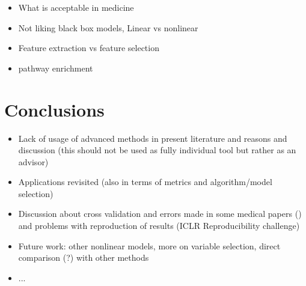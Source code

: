 \documentclass[shortabstract, english, mgr]{iithesis}
\begin{document}
\begin{itemize}
    \item What is acceptable in medicine
    \item Not liking black box models, Linear vs nonlinear
    \item Feature extraction vs feature selection
    \item pathway enrichment
\end{itemize}

\chapter{Conclusions} \label{section:summary}

\begin{itemize}
    \item Lack of usage of advanced methods in present literature and reasons and discussion (this should not be  used as fully individual tool but rather as an advisor) 
    \item Applications revisited (also in terms of metrics and algorithm/model selection)
    \item Discussion about cross validation and errors made in some medical papers (\cite{dimRedInCV}) and problems with reproduction of results (ICLR Reproducibility challenge)
    \item Future work: other nonlinear models, more on variable selection, direct comparison (?) with other methods
    \item ...
    
\end{itemize}



%
\end{document}
